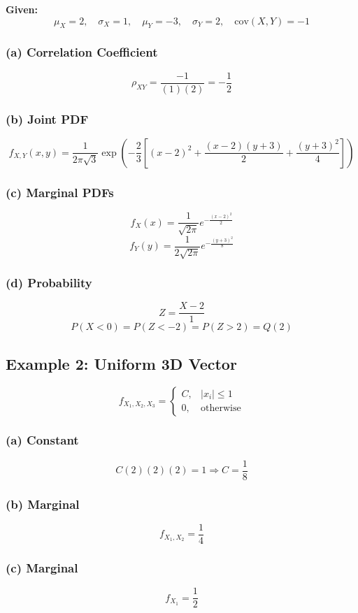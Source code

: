 \documentclass[12pt]{article}
\begin{document}
\textbf{Given:}
\[
\mu_X = 2,\quad \sigma_X = 1,\quad \mu_Y = -3,\quad \sigma_Y = 2,\quad \text{cov}(X,Y) = -1
\]

\subsubsection{(a) Correlation Coefficient}
\[
\rho_{XY} = \frac{-1}{(1)(2)} = -\frac{1}{2}
\]

\subsubsection{(b) Joint PDF}
\[
f_{X,Y}(x,y) = \frac{1}{2\pi \sqrt{3}}
\exp\left(-\frac{2}{3}\left[(x-2)^2 + \frac{(x-2)(y+3)}{2} + \frac{(y+3)^2}{4}\right]\right)
\]

\subsubsection{(c) Marginal PDFs}
\[
f_X(x) = \frac{1}{\sqrt{2\pi}} e^{-\frac{(x-2)^2}{2}}
\]
\[
f_Y(y) = \frac{1}{2\sqrt{2\pi}} e^{-\frac{(y+3)^2}{8}}
\]

\subsubsection{(d) Probability}
\[
Z = \frac{X-2}{1}
\]
\[
P(X < 0) = P(Z < -2) = P(Z > 2) = Q(2)
\]

\subsection{Example 2: Uniform 3D Vector}

\[
f_{X_1,X_2,X_3} =
\begin{cases}
C, & |x_i| \le 1 \\
0, & \text{otherwise}
\end{cases}
\]

\subsubsection{(a) Constant}
\[
C(2)(2)(2) = 1 \Rightarrow C = \frac{1}{8}
\]

\subsubsection{(b) Marginal}
\[
f_{X_1,X_2} = \frac{1}{4}
\]

\subsubsection{(c) Marginal}
\[
f_{X_1} = \frac{1}{2}
\]
\end{document}
